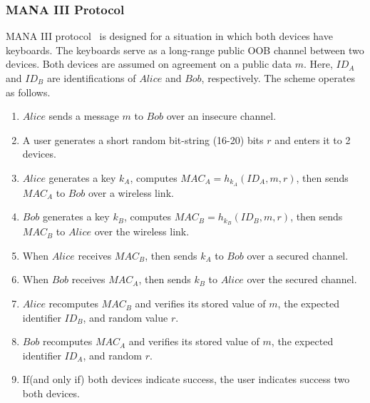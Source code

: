 \subsubsection*{MANA III Protocol}

MANA III protocol~\cite{Mitchell:2004p25948} is designed for a situation in which both devices have keyboards. The keyboards serve as a long-range public OOB channel between two devices. Both devices are assumed on agreement on a public data $m$. Here, $ID_A$ and $ID_B$ are identifications of $Alice$ and $Bob$, respectively. The scheme operates as follows. 

\begin{enumerate}
\item $Alice$ sends a message $m$ to $Bob$ over an insecure channel. 
\item A user generates a short random bit-string (16-20) bits $r$ and enters it to 2 devices.
\item $Alice$ generates a key $k_A$, computes $MAC_A = h_{k_A}(ID_A,m,r)$, then sends $MAC_A$ to $Bob$ over a wireless link.
\item $Bob$ generates a key $k_B$, computes $MAC_B = h_{k_B}(ID_B,m,r)$, then sends $MAC_B$ to $Alice$ over the wireless link.
\item When $Alice$ receives $MAC_B$, then sends $k_A$ to $Bob$ over a secured channel.
\item When $Bob$ receives $MAC_A$, then sends $k_B$ to $Alice$ over the secured channel.
\item $Alice$ recomputes $MAC_B$ and verifies its stored value of $m$, the expected identifier $ID_B$, and random value $r$.
\item $Bob$ recomputes $MAC_A$ and verifies its stored value of $m$, the expected identifier $ID_A$, and random $r$.
\item If(and only if) both devices indicate success, the user indicates success two both devices.
\end{enumerate}


